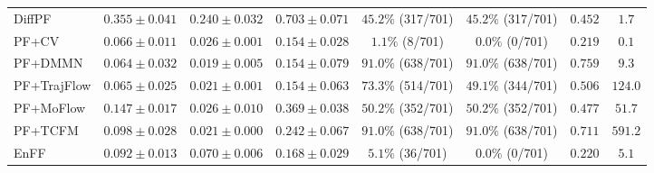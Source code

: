 \begin{table}[t]
{\begin{tabular}{lccccccc}
DiffPF
& $0.355 \pm 0.041$ & $0.240 \pm 0.032$ & $0.703 \pm 0.071$ & $45.2\%$ (317/701) & $45.2\%$ (317/701) & $0.452$ & $1.7$ \\
PF+CV
& $0.066 \pm 0.011$ & $0.026 \pm 0.001$ & $0.154 \pm 0.028$ & $1.1\%$ (8/701) & $0.0\%$ (0/701) & $0.219$ & $0.1$ \\
PF+DMMN
& $0.064 \pm 0.032$ & $0.019 \pm 0.005$ & $0.154 \pm 0.079$ & $\mathbf{91.0\%}$ (638/701) & $\mathbf{91.0\%}$ (638/701) & $\mathbf{0.759}$ & $9.3$ \\
PF+TrajFlow
& $0.065 \pm 0.025$ & $0.021 \pm 0.001$ & $0.154 \pm 0.063$ & $73.3\%$ (514/701) & $49.1\%$ (344/701) & $0.506$ & $124.0$ \\
PF+MoFlow
& $0.147 \pm 0.017$ & $0.026 \pm 0.010$ & $0.369 \pm 0.038$ & $50.2\%$ (352/701) & $50.2\%$ (352/701) & $0.477$ & $51.7$ \\
PF+TCFM
& $0.098 \pm 0.028$ & $0.021 \pm 0.000$ & $0.242 \pm 0.067$ & $\mathbf{91.0\%}$ (638/701) & $\mathbf{91.0\%}$ (638/701) & $0.711$ & $591.2$ \\
EnFF
& $0.092 \pm 0.013$ & $0.070 \pm 0.006$ & $0.168 \pm 0.029$ & $5.1\%$ (36/701) & $0.0\%$ (0/701) & $0.220$ & $5.1$ \\
\hline
\end{tabular}%
}
\end{table}
